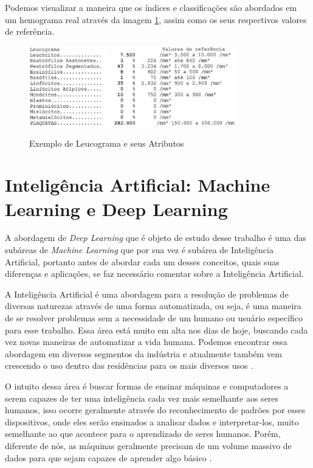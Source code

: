 Podemos visualizar a maneira que os índices e classificações são abordados em um hemograma real através da imagem \ref{fig:leucograma}, assim como os seus respectivos valores de referência.

\begin{figure}[!htb]
	\centering
	\caption{Exemplo de Leucograma e seus Atributos}
	\includegraphics[width=0.80\textwidth]{img/leucograma.jpg}
	\label{fig:leucograma}
\end{figure}

\section{Inteligência Artificial: Machine Learning e Deep Learning}
\label{sec:conceito2}
A abordagem de \emph{Deep Learning} que é objeto de estudo desse trabalho é uma das subáreas de \emph{Machine Learning} que por sua vez é subárea de Inteligência Artificial, portanto antes de abordar cada um desses conceitos, quais suas diferenças e aplicações, se faz necessário comentar sobre a Inteligência Artificial.

A Inteligência Artificial é uma abordagem para a resolução de problemas de diversas naturezas através de uma forma automatizada, ou seja, é uma maneira de se resolver problemas sem a necessidade de um humano ou usuário específico para esse trabalho. Essa área está muito em alta nos dias de hoje, buscando cada vez novas maneiras de automatizar a vida humana. Podemos encontrar essa abordagem em diversos segmentos da indústria e atualmente também vem crescendo o uso dentro das residências para os mais diversos usos \cite{inteligenciaArtificial}.

O intuito dessa área é buscar formas de ensinar máquinas e computadores a serem capazes de ter uma inteligência cada vez mais semelhante aos seres humanos, isso ocorre geralmente através do reconhecimento de padrões por esses dispositivos, onde eles serão ensinados a analisar dados e interpretar-los, muito semelhante ao que acontece para o aprendizado de seres humanos. Porém, diferente de nós, as máquinas geralmente precisam de um volume massivo de dados para que sejam capazes de aprender algo básico \cite{IAAprendizadoMaquina}.

